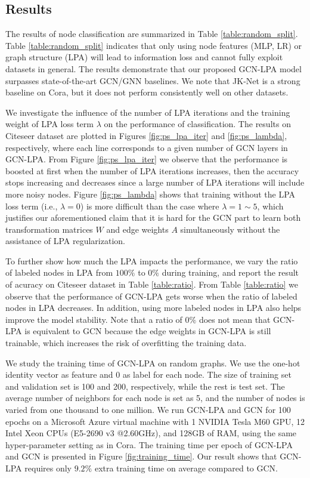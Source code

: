 \documentclass{article}
\begin{document}
		
	\subsection{Results}
		The results of node classification are summarized in Table \ref{table:random_split}.
		Table \ref{table:random_split} indicates that only using node features (MLP, LR) or graph structure (LPA) will lead to information loss and cannot fully exploit datasets in general.
		The results demonstrate that our proposed GCN-LPA model surpasses state-of-the-art GCN/GNN baselines.
We note that JK-Net is a strong baseline on Cora, but it does not perform consistently well on other datasets.
		
		We investigate the influence of the number of LPA iterations and the training weight of LPA loss term $\lambda$ on the performance of classification.
		The results on Citeseer dataset are plotted in Figures \ref{fig:ps_lpa_iter} and \ref{fig:ps_lambda}, respectively, where each line corresponds to a given number of GCN layers in GCN-LPA.
		From Figure \ref{fig:ps_lpa_iter} we observe that the performance is boosted at first when the number of LPA iterations increases, then the accuracy stops increasing and decreases since a large number of LPA iterations will include more noisy nodes.
		Figure \ref{fig:ps_lambda} shows that training without the LPA loss term (i.e., $\lambda=0$) is more difficult than the case where $\lambda = 1 \sim 5$, which justifies our aforementioned claim that it is hard for the GCN part to learn both transformation matrices $W$ and edge weights $A$ simultaneously without the assistance of LPA regularization.
		
		To further show how much the LPA impacts the performance, we vary the ratio of labeled nodes in LPA from $100\%$ to $0\%$ during training, and report the result of acuracy on Citeseer dataset in Table \ref{table:ratio}.
		From Table \ref{table:ratio} we observe that the performance of GCN-LPA gets worse when the ratio of labeled nodes in LPA decreases.
		In addition, using more labeled nodes in LPA also helps improve the model stability.
		Note that a ratio of $0\%$ does not mean that GCN-LPA is equivalent to GCN \citep{kipf2017semi} because the edge weights in GCN-LPA is still trainable, which increases the risk of overfitting the training data.
		
		We study the training time of GCN-LPA on random graphs.
		We use the one-hot identity vector as feature and 0 as label for each node.
		The size of training set and validation set is 100 and 200, respectively, while the rest is test set.
		The average number of neighbors for each node is set as 5, and the number of nodes is varied from one thousand to one million.
		We run GCN-LPA and GCN for 100 epochs on a Microsoft Azure virtual machine with 1 NVIDIA Tesla M60 GPU, 12 Intel Xeon CPUs (E5-2690 v3 @2.60GHz), and 128GB of RAM, using the same hyper-parameter setting as in Cora.
		The training time per epoch of GCN-LPA and GCN is presented in Figure \ref{fig:training_time}.
		Our result shows that GCN-LPA requires only $9.2\%$ extra training time on average compared to GCN.
	
\end{document}
